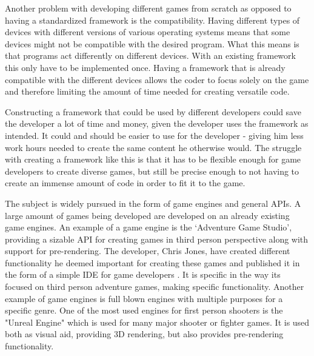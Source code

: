 Another problem with developing different games from scratch as opposed to having a standardized framework is the compatibility. Having different types of devices with different versions of various operating systems means that some devices might not be compatible with the desired program. What this means is that programs act differently on different devices. With an existing framework this only have to be implemented once. Having a framework that is already compatible with the different devices allows the coder to focus solely on the game and therefore limiting the amount of time needed for creating versatile code.

Constructing a framework that could be used by different developers could save the developer a lot of time and money, given the developer uses the framework as intended. It could and should be easier to use for the developer - giving him less work hours needed to create the same content he otherwise would. The struggle with creating a framework like this is that it has to be flexible enough for game developers to create diverse games, but still be precise enough to not having to create an immense amount of code in order to fit it to the game.

The subject is widely pursued in the form of game engines and general APIs. A large amount of games being developed are developed on an already existing game engines. An example of a game engine is the `Adventure Game Studio', providing a sizable API for creating games in third person perspective along with support for pre-rendering. The developer, Chris Jones, have created different functionality he deemed important for creating these games and published it in the form of a simple IDE for game developers \cite{adv-game}. It is specific in the way its focused on third person adventure games, making specific functionality.
Another example of game engines is full blown engines with multiple purposes for a specific genre. One of the most used engines for first person shooters is the "Unreal Engine" which is used for many major shooter or fighter games. It is used both as visual aid, providing 3D rendering, but also provides pre-rendering functionality.




